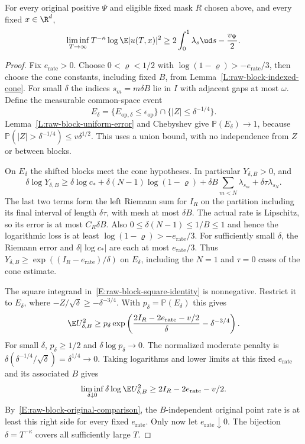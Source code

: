 \begin{proposition}
  \label{P:raw-block-original-lower}
  For every original positive $\Psi$ and eligible fixed mask $R$
  chosen above, and every fixed $x\in\R^d$,
  \begin{equation}\label{E:raw-block-original-lower}
    \liminf_{T\to\infty}T^{-\kappa}\log\E|u(T,x)|^2
    \ge 2\int_0^1\lambda_s\ud s-\frac{v_\Psi}{2}.
  \end{equation}
\end{proposition}

\begin{proof}
  Fix $e_{\mathrm{rate}}>0$. Choose $0<\varrho<1/2$ with
  $\log(1-\varrho)>-e_{\mathrm{rate}}/3$, then choose the cone
  constants, including fixed $B$, from
  Lemma~\ref{L:raw-block-indexed-cone}.
  For small $\delta$ the indices $s_m=m\delta B$ lie in $I$
  with adjacent gaps at most $\omega$.
  Define the measurable common-space event
  \[
    E_\delta=\{E_{\mathrm{op},\delta}\le\epsilon_{\mathrm{op}}\}
    \cap\{|Z|\le\delta^{-1/4}\}.
  \]
  Lemma~\ref{L:raw-block-uniform-error} and Chebyshev give
  $\mathbb P(E_\delta)\to1$, because
  $\mathbb P(|Z|>\delta^{-1/4})\le v\delta^{1/2}$.
  This uses a union bound, with no independence from $Z$ or
  between blocks.

  On $E_\delta$ the shifted blocks meet the cone hypotheses.
  In particular $Y_{\delta,B}>0$, and
  \[
    \delta\log Y_{\delta,B}
    \ge\delta\log c_*+\delta(N-1)\log(1-\varrho)
    +\delta B\sum_{m<N}\lambda_{s_m}
    +\delta\tau\lambda_{s_N}.
  \]
  The last two terms form the left Riemann sum for $I_R$ on
  the partition including its final interval of length
  $\delta\tau$, with mesh at most $\delta B$.
  The actual rate is Lipschitz, so its error is at most $C_R\delta B$.
  Also $0\le\delta(N-1)\le1/B\le1$ and hence the logarithmic
  loss is at least $\log(1-\varrho)>-e_{\mathrm{rate}}/3$.
  For sufficiently small $\delta$, the Riemann error and
  $\delta|\log c_*|$ are each at most $e_{\mathrm{rate}}/3$.
  Thus
  $Y_{\delta,B}\ge\exp((I_R-e_{\mathrm{rate}})/\delta)$ on $E_\delta$,
  including the $N=1$ and $\tau=0$ cases of the cone estimate.

  The square integrand in~\eqref{E:raw-block-square-identity}
  is nonnegative. Restrict it to $E_\delta$, where
  $-Z/\sqrt\delta\ge-\delta^{-3/4}$.
  With $p_\delta=\mathbb P(E_\delta)$ this gives
  \[
    \E U_{\delta,B}^2
    \ge p_\delta
    \exp\left(\frac{2I_R-2e_{\mathrm{rate}}-v/2}{\delta}
    -\delta^{-3/4}\right).
  \]
  For small $\delta$, $p_\delta\ge1/2$ and
  $\delta\log p_\delta\to0$. The normalized moderate penalty is
  $\delta(\delta^{-1/4}/\sqrt\delta)=\delta^{1/4}\to0$.
  Taking logarithms and lower limits at this fixed
  $e_{\mathrm{rate}}$ and its associated $B$ gives
  \[
    \liminf_{\delta\downarrow0}\delta\log\E U_{\delta,B}^2
    \ge2I_R-2e_{\mathrm{rate}}-v/2.
  \]
  By~\eqref{E:raw-block-original-comparison}, the
  $B$-independent original point rate is at least this right side
  for every fixed $e_{\mathrm{rate}}$. Only now let
  $e_{\mathrm{rate}}\downarrow0$. The bijection
  $\delta=T^{-\kappa}$ covers all sufficiently large $T$.


\end{proof}
